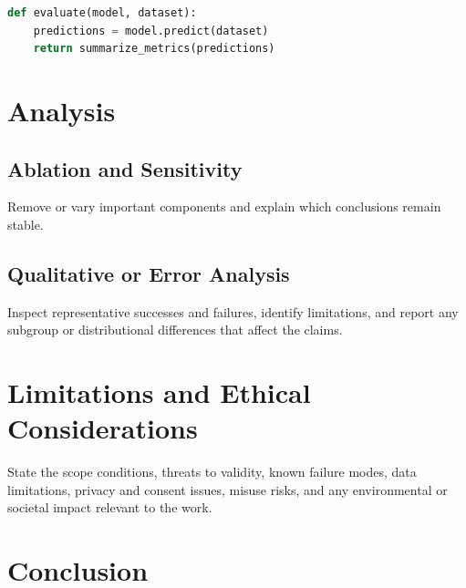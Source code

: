 \documentclass[sigconf,anonymous,review]{acmart}
\begin{document}
\begin{lstlisting}[language=Python,caption={Placeholder for a short reproducibility-critical code fragment.},label={lst:code}]
def evaluate(model, dataset):
    predictions = model.predict(dataset)
    return summarize_metrics(predictions)
\end{lstlisting}

\section{Analysis}
\label{sec:analysis}

\subsection{Ablation and Sensitivity}
\label{sec:ablation}

Remove or vary important components and explain which conclusions remain
stable.

\subsection{Qualitative or Error Analysis}
\label{sec:error-analysis}

Inspect representative successes and failures, identify limitations, and
report any subgroup or distributional differences that affect the claims.

\section{Limitations and Ethical Considerations}
\label{sec:limitations}

State the scope conditions, threats to validity, known failure modes, data
limitations, privacy and consent issues, misuse risks, and any environmental
or societal impact relevant to the work.

\section{Conclusion}
\label{sec:conclusion}
\end{document}
